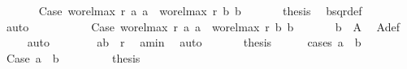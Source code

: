 \begin{isabellebody}
\ \ \ \ \ \isamarkupfalse%
\ Case{}{\isacharcolon}{\kern0pt}\ {\isachardoublequoteopen}wo{\isacharunderscore}{\kern0pt}rel{\isachardot}{\kern0pt}max{}\ r\ a{}\ a{}\ {\isasymnoteq}\ wo{\isacharunderscore}{\kern0pt}rel{\isachardot}{\kern0pt}max{}\ r\ b{}\ b{}{\isachardoublequoteclose}\isanewline
\ \ \ \ \ \isamarkupfalse%
\ {\isacharquery}{\kern0pt}thesis\ \isamarkupfalse%
\ bsqr{\isacharunderscore}{\kern0pt}def\ \isamarkupfalse%
\ {}\ {}\ \isamarkupfalse%
\ auto\isanewline
\ \ \ \isamarkupfalse%
\isanewline
\ \ \ \ \ \isamarkupfalse%
\ Case{}{\isacharcolon}{\kern0pt}\ {\isachardoublequoteopen}wo{\isacharunderscore}{\kern0pt}rel{\isachardot}{\kern0pt}max{}\ r\ a{}\ a{}\ {\isacharequal}{\kern0pt}\ wo{\isacharunderscore}{\kern0pt}rel{\isachardot}{\kern0pt}max{}\ r\ b{}\ b{}{\isachardoublequoteclose}\isanewline
\ \ \ \ \ \isamarkupfalse%
\ {\isachardoublequoteopen}b{}\ {\isasymin}\ A{}{\isachardoublequoteclose}\ \isamarkupfalse%
\ A{}{\isacharunderscore}{\kern0pt}def\ \isamarkupfalse%
\ {}\ {\isacharasterisk}{\kern0pt}{\isacharasterisk}{\kern0pt}{\isacharasterisk}{\kern0pt}\ \isamarkupfalse%
\ auto\isanewline
\ \ \ \ \ \isamarkupfalse%
\ {}{\isacharcolon}{\kern0pt}\ {\isachardoublequoteopen}{\isacharparenleft}{\kern0pt}a{}{\isacharcomma}{\kern0pt}b{}{\isacharparenright}{\kern0pt}\ {\isasymin}\ r{\isachardoublequoteclose}\ \isamarkupfalse%
\ a{}{\isacharunderscore}{\kern0pt}min\ \isamarkupfalse%
\ auto\isanewline
\ \ \ \ \ \isamarkupfalse%
\ {\isacharquery}{\kern0pt}thesis\isanewline
\ \ \ \ \ \isamarkupfalse%
{\isacharparenleft}{\kern0pt}cases\ {\isachardoublequoteopen}a{}\ {\isacharequal}{\kern0pt}\ b{}{\isachardoublequoteclose}{\isacharparenright}{\kern0pt}\isanewline
\ \ \ \ \ \ \ \isamarkupfalse%
\ Case{}{}{\isacharcolon}{\kern0pt}\ {\isachardoublequoteopen}a{}\ {\isasymnoteq}\ b{}{\isachardoublequoteclose}\isanewline
\ \ \ \ \ \ \ \isamarkupfalse%
\ {\isacharquery}{\kern0pt}thesis\ \isamarkupfalse%

\end{isabellebody}
